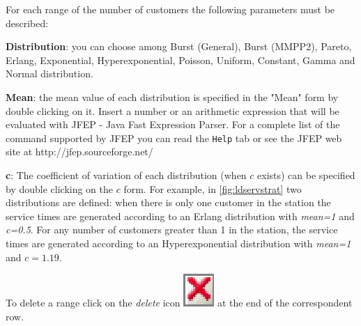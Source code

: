 \begin{itemize*}
For each range of the number of customers the following parameters
must be described: \begin{itemize*} \item \textbf{Distribution}:
you can choose among Burst (General), Burst (MMPP2), Pareto,
Erlang, Exponential, Hyperexponential, Poisson, Uniform, Constant,
Gamma and Normal distribution. \item \textbf{Mean}: the mean value
of each distribution is specified in the "Mean" form by double
clicking on it. Insert a number or an arithmetic expression that
will be evaluated with JFEP - Java Fast Expression Parser. For a
complete list of the command supported by JFEP you can read the
\texttt{Help} tab or see the JFEP web site at
http://jfep.sourceforge.net/ \item \textbf{c}: The coefficient of
variation of each distribution (when $c$ exists) can be specified
by double clicking on the $c$ form. For example, in
\autoref{fig:ldservstrat} two distributions are defined: when
there is only one customer in the station the service times are
generated according to an Erlang distribution with \emph{mean=1}
and \emph{c=0.5}. For any number of customers greater than 1 in
the station, the service times are generated according to an
Hyperexponential distribution with \emph{mean=1} and $c=1.19$.
\end{itemize*}
\noindent To delete a range click on the \emph{delete} icon
\includegraphics[scale=.5]{img/jsim/delete.eps}
at the end of the correspondent row.

\end{itemize*}

